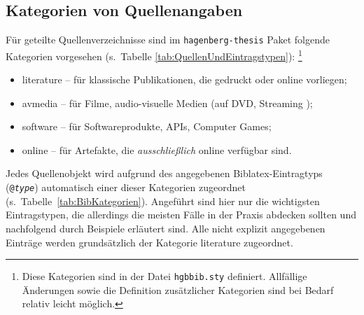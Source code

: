 \subsection{Kategorien von Quellenangaben}
\label{sec:BibKategorien}

Für geteilte Quellenverzeichnisse sind im \texttt{hagenberg-thesis} Paket folgende
Kategorien vorgesehen (s.\ Tabelle \ref{tab:QuellenUndEintragstypen}):%
\footnote{Diese Kategorien sind in der Datei \nolinkurl{hgbbib.sty} definiert.
Allfällige Änderungen sowie die Definition zusätzlicher Kategorien sind bei
Bedarf relativ leicht möglich.}
%
\begin{itemize}
    \item[] \textsf{literature} -- für klassische Publikationen, die gedruckt
    oder online vorliegen;
    \item[] \textsf{avmedia} -- für Filme, audio-visuelle Medien (auf DVD,
    Streaming \usw);
    \item[] \textsf{software} -- für Softwareprodukte, APIs, Computer Games;
    \item[] \textsf{online} -- für Artefakte, die \emph{ausschließlich}
    online verfügbar sind.
\end{itemize}
%
Jedes Quellenobjekt wird aufgrund des angegebenen Biblatex-Eintragtyps
(\texttt{@\emph{type}}) automatisch einer dieser Kategorien zugeordnet (s.\
Tabelle~\ref{tab:BibKategorien}). Angeführt sind hier nur die wichtigsten
Eintragstypen, die allerdings die meisten Fälle in der Praxis abdecken
sollten und nachfolgend durch Beispiele erläutert sind. Alle nicht explizit
angegebenen Einträge werden grundsätzlich der Kategorie \textsf{literature}
zugeordnet.

